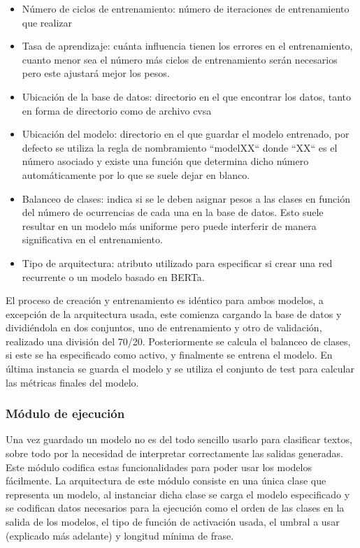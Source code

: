 \begin{itemize}
    \item  Número de ciclos de entrenamiento: número de iteraciones de
    entrenamiento que realizar 
    \item Tasa de aprendizaje: cuánta influencia tienen los
    errores en el entrenamiento, cuanto menor sea el número más ciclos de
    entrenamiento serán necesarios pero este ajustará mejor los pesos. 
    \item  Ubicación de la base de datos: directorio en el que encontrar los
    datos, tanto en forma de directorio como de archivo \gls{cvsa}  
    \item  Ubicación del modelo: directorio en el que guardar el modelo
    entrenado, por defecto se utiliza la regla de nombramiento ``modelXX`` donde
    ``XX`` es el número asociado y existe una función que determina dicho número
    automáticamente por lo que se suele dejar en blanco.  
    \item  Balanceo de clases: indica si se le deben asignar pesos a las clases
    en función del número de ocurrencias de cada una en la base de datos. Esto
    suele resultar en un modelo más uniforme pero puede interferir de manera
    significativa en el entrenamiento. 
    \item  Tipo de arquitectura: atributo utilizado para especificar si crear
    una red recurrente o un modelo basado en \gls{BERTa}.
\end{itemize}
El proceso de creación y entrenamiento es idéntico para ambos modelos, a
excepción de la arquitectura usada, este comienza cargando la base de datos y
dividiéndola en dos conjuntos, uno de entrenamiento y otro de validación,
realizado una división del 70/20. Posteriormente se calcula el balanceo de
clases, si este se ha especificado como activo, y finalmente se entrena el
modelo. En última instancia se guarda el modelo y se utiliza el conjunto de
test para calcular las métricas finales del modelo.

\subsubsection{Módulo de ejecución} Una vez guardado un modelo no es del todo sencillo usarlo
para clasificar textos, sobre todo por la necesidad de interpretar correctamente
las salidas generadas. Este módulo codifica estas funcionalidades para poder
usar los modelos fácilmente. La arquitectura de este módulo consiste en una
única clase que representa un modelo, al instanciar dicha clase se carga el
modelo especificado y se codifican datos necesarios para la ejecución como el
orden de las clases en la salida de los modelos, el tipo de función de
activación usada, el umbral a usar (explicado más adelante) y longitud mínima de
frase. 

